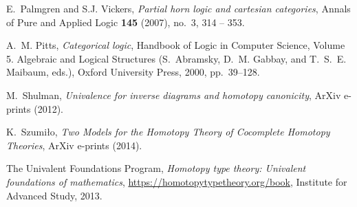 \documentclass{mscs}
\numberwithin{figure}{section}
\begin{document}
\begin{thebibliography}{}
E.~Palmgren and S.J. Vickers, \emph{Partial horn logic and cartesian
  categories}, Annals of Pure and Applied Logic \textbf{145} (2007), no.~3, 314
  -- 353.

A.~M. Pitts, \emph{Categorical logic}, Handbook of Logic in Computer Science,
  Volume 5. Algebraic and Logical Structures (S.~Abramsky, D.~M. Gabbay, and
  T.~S.~E. Maibaum, eds.), Oxford University Press, 2000, pp.~39--128.

M.~{Shulman}, \emph{{Univalence for inverse diagrams and homotopy canonicity}},
  ArXiv e-prints (2012).

K.~{Szumi{\l}o}, \emph{{Two Models for the Homotopy Theory of Cocomplete
  Homotopy Theories}}, ArXiv e-prints (2014).

The {Univalent Foundations Program}, \emph{Homotopy type theory: Univalent
  foundations of mathematics}, \url{https://homotopytypetheory.org/book},
  Institute for Advanced Study, 2013.
\end{thebibliography}
\end{document}
